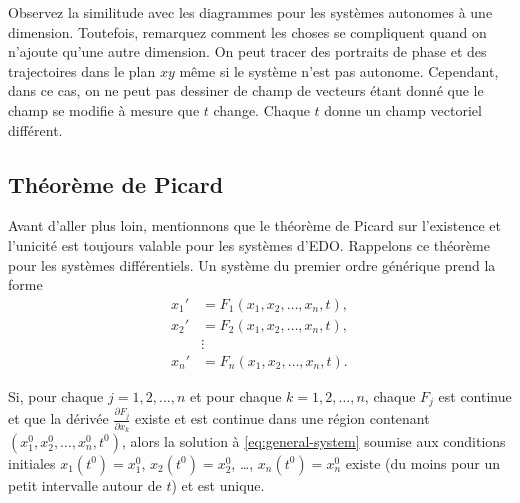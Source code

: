 \begin{myfig}
\parbox[t]{3.0in}{
 \capstart
 \caption{Portrait de phase pour $x' = 2y-x$, $y' = x$.%
 \label{sintro-vectorfield:fig}}
}
\quad
\parbox[t]{3.0in}{
 \capstart
 \caption{Portrait de phase pour $x' = 2y-x$, $y' = x$, avec la trajectoire de la solution commençant au point $(1,0)$
 pour $0 \leq t \leq 2$.%
 \label{sintro-vectorfield-sol:fig}}
}
\end{myfig}


Observez la similitude avec les diagrammes pour les systèmes autonomes à une dimension. Toutefois, remarquez comment les choses se compliquent quand on n'ajoute qu'une autre dimension.
On peut tracer des portraits de phase et des trajectoires dans le plan $xy$
même si le système n'est pas autonome. Cependant, dans ce cas, on ne peut pas dessiner de champ de vecteurs étant donné que le champ se modifie à mesure que $t$ change. Chaque $t$ donne un champ vectoriel différent.

\subsection{Théorème de Picard}

Avant d'aller plus loin, mentionnons que le théorème de Picard sur l'existence et l'unicité est toujours valable pour les systèmes d'EDO\@. Rappelons ce théorème pour les systèmes différentiels. Un système du premier ordre générique prend la forme
\begin{equation} \label{eq:general-system}
\begin{aligned}
x_1' & = F_1(x_1,x_2,\ldots,x_n,t) , \\
x_2' & = F_2(x_1,x_2,\ldots,x_n,t) , \\
& \vdots \\
x_n' & = F_n(x_1,x_2,\ldots,x_n,t) .
\end{aligned}
\end{equation}

\begin{theorem}%
\label{sys:picardthm}%
Si, pour chaque $j=1,2,\ldots,n$ et pour chaque
$k = 1,2,\ldots,n$,
chaque $F_j$ est continue et que la dérivée
$\frac{\partial F_j}{\partial x_k}$ existe et est continue dans une région contenant $(x_1^0,x_2^0,\ldots,x_n^0,t^0)$, alors la solution à 
\eqref{eq:general-system}
soumise aux conditions initiales
$x_1(t^0) = x_1^0$,
$x_2(t^0) = x_2^0$, \ldots,
$x_n(t^0) = x_n^0$
existe (du moins pour un petit intervalle autour de $t$) et est unique.
\end{theorem}

